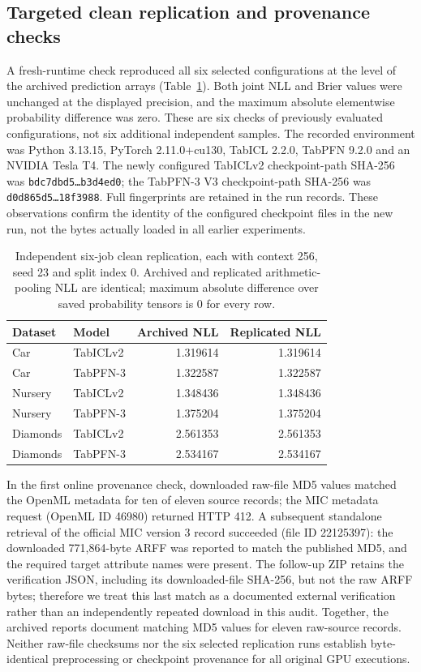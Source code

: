 \documentclass[a4paper,fleqn]{cas-sc}
\begin{document}
\subsection{Targeted clean replication and provenance checks}
A fresh-runtime check reproduced all six selected configurations at the level of the archived prediction arrays (Table~\ref{tab:cleanrep}). Both joint NLL and Brier values were unchanged at the displayed precision, and the maximum absolute elementwise probability difference was zero. These are six checks of previously evaluated configurations, not six additional independent samples. The recorded environment was Python 3.13.15, PyTorch 2.11.0+cu130, TabICL 2.2.0, TabPFN 9.2.0 and an NVIDIA Tesla T4. The newly configured TabICLv2 checkpoint-path SHA-256 was \texttt{bdc7dbd5\ldots b3d4ed0}; the TabPFN-3 V3 checkpoint-path SHA-256 was \texttt{d0d865d5\ldots 18f3988}. Full fingerprints are retained in the run records. These observations confirm the identity of the configured checkpoint files in the new run, not the bytes actually loaded in all earlier experiments.

\begin{table}[htbp]
\centering
\caption{Independent six-job clean replication, each with context 256, seed 23 and split index 0. Archived and replicated arithmetic-pooling NLL are identical; maximum absolute difference over saved probability tensors is 0 for every row.}
\label{tab:cleanrep}
\begin{tabular}{llrr}
\toprule
Dataset & Model & Archived NLL & Replicated NLL\\
\midrule
Car & TabICLv2 & 1.319614 & 1.319614\\
Car & TabPFN-3 & 1.322587 & 1.322587\\
Nursery & TabICLv2 & 1.348436 & 1.348436\\
Nursery & TabPFN-3 & 1.375204 & 1.375204\\
Diamonds & TabICLv2 & 2.561353 & 2.561353\\
Diamonds & TabPFN-3 & 2.534167 & 2.534167\\
\bottomrule
\end{tabular}
\end{table}

In the first online provenance check, downloaded raw-file MD5 values matched the OpenML metadata for ten of eleven source records; the MIC metadata request (OpenML ID 46980) returned HTTP 412. A subsequent standalone retrieval of the official MIC version 3 record succeeded (file ID 22125397): the downloaded 771,864-byte ARFF was reported to match the published MD5, and the required target attribute names were present. The follow-up ZIP retains the verification JSON, including its downloaded-file SHA-256, but not the raw ARFF bytes; therefore we treat this last match as a documented external verification rather than an independently repeated download in this audit. Together, the archived reports document matching MD5 values for eleven raw-source records. Neither raw-file checksums nor the six selected replication runs establish byte-identical preprocessing or checkpoint provenance for all original GPU executions.
\end{document}
